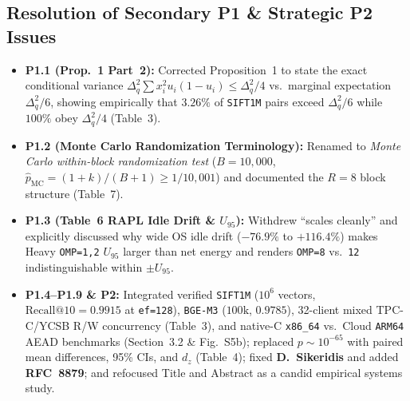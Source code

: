 \documentclass[10pt]{article}
\begin{document}
\subsection*{Resolution of Secondary P1 \& Strategic P2 Issues}
\begin{itemize}
    \item \textbf{P1.1 (Prop.~1 Part~2):} Corrected Proposition~1 to state the exact conditional variance $\Delta_q^2\sum x_i^2 u_i(1-u_i) \le \Delta_q^2/4$ vs.\ marginal expectation $\Delta_q^2/6$, showing empirically that $3.26\%$ of \texttt{SIFT1M} pairs exceed $\Delta_q^2/6$ while $100\%$ obey $\Delta_q^2/4$ (Table~3).
    \item \textbf{P1.2 (Monte Carlo Randomization Terminology):} Renamed to \emph{Monte Carlo within-block randomization test} ($B=10{,}000$, $\hat{p}_{\text{MC}}=(1+k)/(B+1) \ge 1/10{,}001$) and documented the $R=8$ block structure (Table~7).
    \item \textbf{P1.3 (Table~6 RAPL Idle Drift \& $U_{95}$):} Withdrew ``scales cleanly'' and explicitly discussed why wide OS idle drift ($-76.9\%$ to $+116.4\%$) makes Heavy \texttt{OMP=1,2} $U_{95}$ larger than net energy and renders \texttt{OMP=8} vs.\ \texttt{12} indistinguishable within $\pm U_{95}$.
    \item \textbf{P1.4--P1.9 \& P2:} Integrated verified \texttt{SIFT1M} ($10^6$ vectors, $\mathrm{Recall}@10=0.9915$ at \texttt{ef=128}), \texttt{BGE-M3} ($100\text{k}$, $0.9785$), 32-client mixed TPC-C/YCSB R/W concurrency (Table~3), and native-C \nolinkurl{x86_64} vs.\ Cloud \texttt{ARM64} AEAD benchmarks (Section~3.2 \& Fig.~S5b); replaced $p \sim 10^{-65}$ with paired mean differences, 95\% CIs, and $d_z$ (Table~4); fixed \textbf{D.~Sikeridis} and added \textbf{RFC~8879}; and refocused Title and Abstract as a candid empirical systems study.
\end{itemize}
\end{document}
